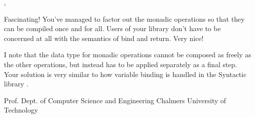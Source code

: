 \vspace{5mm} 

\noindent\colorbox{light-gray}{
\begin{minipage}[]{0.9\linewidth}
\noindent 
\studname{},
\newline

Fascinating! You've managed to factor out the monadic operations so
that they can be compiled once and for all. Users of your library
don't have to be concerned at all with the semantics of bind and return.
Very nice!
\newline

\noindent 
I note that the data type for monadic operations cannot be composed as
freely as the other operations, but instead has to be applied
separately as a final step. Your
solution is very similar to how variable binding is handled in the
Syntactic library .
\newline \newline

\noindent Prof. \docname{}
\newline
\noindent Dept. of Computer Science and Engineering \newline
\noindent Chalmers University of Technology 
\end{minipage} 
}







